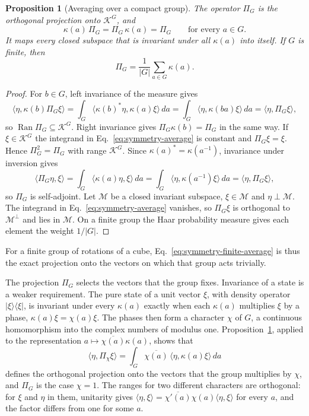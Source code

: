 \documentclass[11pt]{article}
\newtheorem{proposition}{Proposition}[section]
\theoremstyle{definition}
\DeclareMathOperator{\Ran}{Ran}
\newcommand{\ket}[1]{\lvert #1\rangle}
\newcommand{\bra}[1]{\langle #1\rvert}
\begin{document}
\begin{proposition}[Averaging over a compact group]
\label{prop:symmetry-projection}
The operator $\Pi_G$ is the orthogonal projection onto $\mathcal K^G$, and
\begin{equation}
 \kappa(a)\,\Pi_G=\Pi_G\,\kappa(a)=\Pi_G\qquad\text{for every }a\in G .
 \label{eq:symmetry-absorption}
\end{equation}
It maps every closed subspace that is invariant under all $\kappa(a)$ into itself. If $G$ is finite, then
\begin{equation}
 \Pi_G=\frac1{|G|}\sum_{a\in G}\kappa(a).
 \label{eq:symmetry-finite-average}
\end{equation}
\end{proposition}
\begin{proof}
For $b\in G$, left invariance of the measure gives
\[
 \langle\eta,\kappa(b)\Pi_G\xi\rangle=\int_G\langle\kappa(b)^*\eta,\kappa(a)\xi\rangle\,da
   =\int_G\langle\eta,\kappa(ba)\xi\rangle\,da=\langle\eta,\Pi_G\xi\rangle ,
\]
so $\Ran\Pi_G\subseteq\mathcal K^G$. Right invariance gives $\Pi_G\kappa(b)=\Pi_G$ in the same way. If $\xi\in\mathcal K^G$ the integrand in Eq.~\eqref{eq:symmetry-average} is constant and $\Pi_G\xi=\xi$. Hence $\Pi_G^2=\Pi_G$ with range $\mathcal K^G$. Since $\kappa(a)^*=\kappa(a^{-1})$, invariance under inversion gives
\[
 \langle\Pi_G\eta,\xi\rangle=\int_G\langle\kappa(a)\eta,\xi\rangle\,da
   =\int_G\langle\eta,\kappa(a^{-1})\xi\rangle\,da=\langle\eta,\Pi_G\xi\rangle ,
\]
so $\Pi_G$ is self-adjoint. Let $\mathcal M$ be a closed invariant subspace, $\xi\in\mathcal M$ and $\eta\perp\mathcal M$. The integrand in Eq.~\eqref{eq:symmetry-average} vanishes, so $\Pi_G\xi$ is orthogonal to $\mathcal M^\perp$ and lies in $\mathcal M$. On a finite group the Haar probability measure gives each element the weight $1/|G|$.
\end{proof}

For a finite group of rotations of a cube, Eq.~\eqref{eq:symmetry-finite-average} is thus the exact projection onto the vectors on which that group acts trivially.

The projection $\Pi_G$ selects the vectors that the group fixes. Invariance of a state is a weaker requirement. The pure state of a unit vector $\xi$, with density operator $\ket{\xi}\bra{\xi}$, is invariant under every $\kappa(a)$ exactly when each $\kappa(a)$ multiplies $\xi$ by a phase, $\kappa(a)\xi=\chi(a)\xi$. The phases then form a character $\chi$ of $G$, a continuous homomorphism into the complex numbers of modulus one. Proposition~\ref{prop:symmetry-projection}, applied to the representation $a\mapsto\overline{\chi(a)}\kappa(a)$, shows that
\begin{equation}
 \langle\eta,\Pi_\chi\xi\rangle=\int_G\overline{\chi(a)}\,\langle\eta,\kappa(a)\xi\rangle\,da
 \label{eq:symmetry-character-projection}
\end{equation}
defines the orthogonal projection onto the vectors that the group multiplies by $\chi$, and $\Pi_G$ is the case $\chi=1$. The ranges for two different characters are orthogonal: for $\xi$ and $\eta$ in them, unitarity gives $\langle\eta,\xi\rangle=\overline{\chi'(a)}\chi(a)\langle\eta,\xi\rangle$ for every $a$, and the factor differs from one for some $a$.
\end{document}
